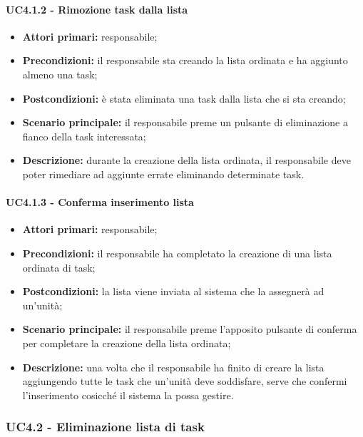 \paragraph{UC4.1.2 - Rimozione task dalla lista}
\begin{itemize}
	\item 	\textbf{Attori primari:} responsabile;
	\item 	\textbf{Precondizioni:} il responsabile sta creando la lista ordinata e ha aggiunto almeno una task;
	\item 	\textbf{Postcondizioni:} è stata eliminata una task dalla lista che si sta creando;
	\item 	\textbf{Scenario principale:} il responsabile preme un pulsante di eliminazione a fianco della task interessata;
	\item 	\textbf{Descrizione:} durante la creazione della lista ordinata, il responsabile deve poter rimediare ad aggiunte errate eliminando determinate task.
\end{itemize}
\paragraph{UC4.1.3 - Conferma inserimento lista}
\begin{itemize}
	\item 	\textbf{Attori primari:} responsabile;
	\item 	\textbf{Precondizioni:} il responsabile ha completato la creazione di una lista ordinata di task;
	\item 	\textbf{Postcondizioni:} la lista viene inviata al sistema che la assegnerà ad un'unità;
	\item 	\textbf{Scenario principale:} il responsabile preme l'apposito pulsante di conferma per completare la creazione della lista ordinata;
	\item 	\textbf{Descrizione:} una volta che il responsabile ha finito di creare la lista aggiungendo tutte le task che un'unità deve soddisfare, serve che confermi l'inserimento cosicché il sistema la possa gestire.
	
\end{itemize}


\subsubsection{UC4.2 - Eliminazione lista di task}

